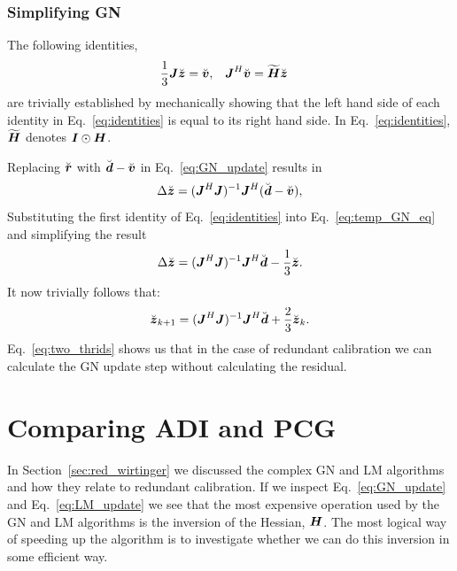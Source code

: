 \documentclass[useAMS,usenatbib]{mn2e}
\newcommand{\bz}{\bmath{z}}
\newcommand{\br}{\bmath{r}}
\newcommand{\bg}{\bmath{g}}
\newcommand{\bd}{\bmath{d}}
\newcommand{\bv}{\bmath{v}}
\newcommand{\bJ}{\bmath{J}}
\newcommand{\bH}{\bmath{H}}
\newcommand{\bI}{\bmath{I}}
\newcommand{\conj}[1]{\overline{#1}}
\begin{document}
\subsubsection{Simplifying GN}

The following identities,
\begin{align}
\label{eq:identities}
\frac{1}{3}\bJ\breve{\bz} &= \breve{\bv}, & \bJ^H\breve{\bv} &= \widetilde{\bH}\breve{\bz} 
\end{align}
are trivially established by mechanically showing that the left hand side of each identity in Eq.~\eqref{eq:identities} is equal to its right hand side.
In Eq.~\eqref{eq:identities}, $\widetilde{\bH}$ denotes $\bI\odot\bH$.

Replacing $\breve{\br}$ with $\breve{\bd}-\breve{\bv}$ in Eq.~\eqref{eq:GN_update} results in
\begin{equation}
\label{eq:temp_GN_eq}
\Delta \breve{\bz} = (\bJ^H\bJ)^{-1}\bJ^H(\breve{\bd}-\breve{\bv}), 
\end{equation}
Substituting the first identity of Eq.~\eqref{eq:identities} into Eq.~\eqref{eq:temp_GN_eq} and simplifying the result 
\begin{equation}
\label{eq:one_thrid}
\Delta \breve{\bz} = (\bJ^H\bJ)^{-1}\bJ^H\breve{\bd}-\frac{1}{3}\breve{\bz}.
\end{equation}
It now trivially follows that:
\begin{equation}
\label{eq:two_thrids}
\breve{\bz}_{k+1} = (\bJ^H\bJ)^{-1}\bJ^H\breve{\bd} + \frac{2}{3}\breve{\bz}_{k}. 
\end{equation}
Eq.~\eqref{eq:two_thrids} shows us that in the case of redundant calibration we can calculate the GN update step without calculating the residual. 
% 

\section{Comparing ADI and PCG}
\label{sec:results}
In Section~\ref{sec:red_wirtinger} we discussed the complex GN and LM algorithms and how they relate to redundant calibration. If we inspect Eq.~\eqref{eq:GN_update} and 
Eq.~\eqref{eq:LM_update} we see that the most expensive operation used by the GN and LM algorithms is the inversion of the Hessian, $\bH$. The most logical 
way of speeding up the algorithm is to investigate whether we can do this inversion in some efficient way.
\end{document}
